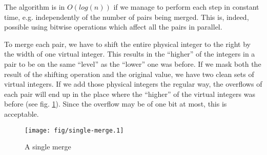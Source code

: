         The algorithm is in $O(log(n))$ if we manage to perform each step in
        constant time, e.g. independently of the number of pairs being merged.
        This is, indeed, possible using bitwise operations which affect all the
        pairs in parallel.

        To merge each pair, we have to shift the entire physical integer to the
        right by the width of one virtual integer.
        This results in the ``higher'' of the integers in a pair to be on the
        same ``level'' as the ``lower'' one was before.
        If we mask both the result of the shifting operation and the original
        value, we have two clean sets of virtual integers.
        If we add those physical integers the regular way, the overflows of each
        pair will end up in the place where the ``higher'' of the virtual
        integers was before (see fig. \ref{fig:misc-bitcount-single_merge}).
        Since the overflow may be of one bit at most, this is acceptable.

        \begin{figure}[!h]
            \caption{A single merge}
            \label{fig:misc-bitcount-single_merge}
            \begin{center}
                \texttt{[image: fig/single-merge.1]}
            \end{center}
        \end{figure}

